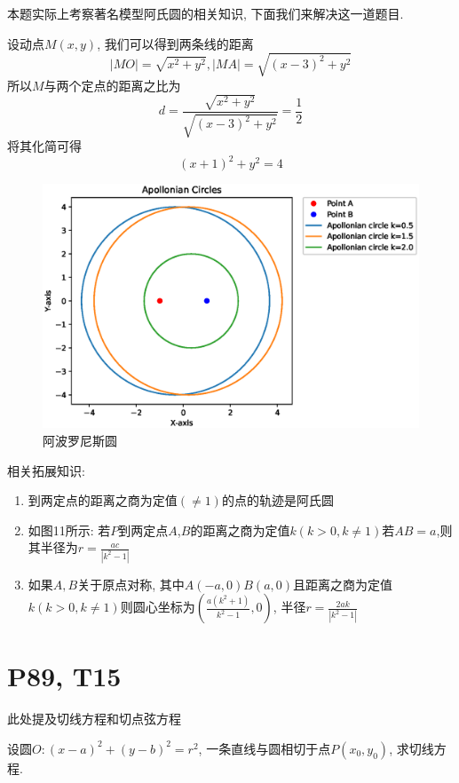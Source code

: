 \documentclass{book}
\begin{document}
    本题实际上考察著名模型\textcolor[rgb]{0.38,0.11,0.2}{阿氏圆}的相关知识, 下面我们来解决这一道题目.

    设动点$M\left( x,y \right)$, 我们可以得到两条线的距离$$|MO|=\sqrt{x^2+y^2},|MA|=\sqrt{\left( x-3 \right)^2+y^2}$$
    所以$M$与两个定点的距离之比为$$d=\frac{\sqrt{x^2+y^2}}{\sqrt{\left( x-3 \right)^2+y^2}}=\frac{1}{2}$$
    将其化简可得$$\left( x+1 \right)^2+y^2=4$$
    \begin{figure}[htbp]
        \centering
        \includegraphics[width=\textwidth]{img/ApollonianCircles.eps}
        \caption{阿波罗尼斯圆}
    \end{figure}

    相关拓展知识:

    \begin{enumerate}
        \item 到两定点的距离之商为定值$(\neq 1)$的点的轨迹是阿氏圆
        \item 如图11所示: 若$P$到两定点$A$,$B$的距离之商为定值$k(k>0,k\neq1)$若$AB=a$,则其半径为$\displaystyle r=\frac{ac}{\left| k^2-1 \right|}$
        \item 如果$A,B$关于原点对称, 其中$A(-a,0)B(a,0)$且距离之商为定值$k(k>0,k\neq 1)$则圆心坐标为$\displaystyle \left( \frac{a\left( k^2+1 \right)}{k^2-1},0 \right)$, 半径$\displaystyle r=\frac{2ak}{\left| k^2-1 \right|}$
    \end{enumerate}
    \section{\textcolor[rgb]{0.11,0.65,0.52}{P89, T15}}
    此处提及\textcolor[rgb]{0.38,0.11,0.2}{切线方程}和\textcolor[rgb]{0.38,0.11,0.2}{切点弦方程}
    \begin{boxB}
        设圆$\displaystyle O:\left( x-a \right)^2+\left( y-b \right)^2=r^2$, 一条直线与圆相切于点$P\left( x_0,y_0 \right)$, 求切线方程.
    \end{boxB}
\end{document}
